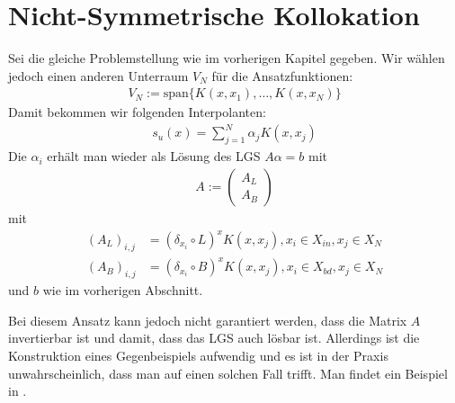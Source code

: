\section{Nicht-Symmetrische Kollokation}
Sei die gleiche Problemstellung wie im vorherigen Kapitel gegeben. Wir wählen jedoch einen anderen Unterraum $V_N$ für die Ansatzfunktionen:
\begin{align*}
V_N := \text{span} \{K(x,x_1), \dots, K(x,x_N) \}
\end{align*}
Damit bekommen wir folgenden Interpolanten:
\begin{align*}
s_u(x) = \sum_{j=1}^N \alpha_j K(x,x_j)
\end{align*}
Die $\alpha_i$ erhält man wieder als Lösung des \ac{LGS} $A \alpha = b$ mit
\begin{align*}
A := \begin{pmatrix}
A_L \\ 
A_B
\end{pmatrix} 
\end{align*}
mit
\begin{align*}
(A_L)_{i,j} &= (\delta_{x_i} \circ L)^x K(x,x_j), x_i \in X_{in}, x_j \in X_N\\
(A_B)_{i,j} &= (\delta_{x_i} \circ B)^x K(x,x_j), x_i \in X_{bd}, x_j \in X_N
\end{align*}
und
$b$ wie im vorherigen Abschnitt.

Bei diesem Ansatz kann jedoch nicht garantiert werden, dass die Matrix $A$ invertierbar ist und damit, dass das \ac{LGS} auch lösbar ist. Allerdings ist die Konstruktion eines Gegenbeispiels aufwendig und es ist in der Praxis unwahrscheinlich, dass man auf einen solchen Fall trifft. Man findet ein Beispiel in \textcite{Hon.2001}.
